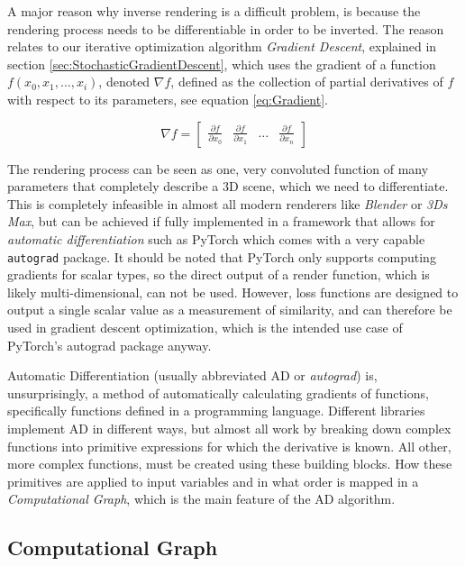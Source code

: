 A major reason why inverse rendering is a difficult problem, is because the rendering process needs to be differentiable in order to be inverted. The reason relates to our iterative optimization algorithm \textit{Gradient Descent}, explained in section \ref{sec:StochasticGradientDescent}, which uses the gradient of a function $f(x_0, x_1, ..., x_i)$, denoted $\nabla f$, defined as the collection of partial derivatives of $f$ with respect to its parameters, see equation \ref{eq:Gradient}. 

\begin{equation}\label{eq:Gradient}
    \nabla f = \begin{bmatrix} \frac{\partial f}{\partial x_0} & \frac{\partial f}{\partial x_1} & \dots & \frac{\partial f}{\partial x_n}\end{bmatrix}
\end{equation}

The rendering process can be seen as one, very convoluted function of many parameters that completely describe a 3D scene, which we need to differentiate. This is completely infeasible in almost all modern renderers like \textit{Blender} or \textit{3Ds Max}, but can be achieved if fully implemented in a framework that allows for \textit{automatic differentiation} such as PyTorch which comes with a very capable \texttt{autograd} package. It should be noted that PyTorch only supports computing gradients for scalar types, so the direct output of a render function, which is likely multi-dimensional, can not be used. However, loss functions are designed to output a single scalar value as a measurement of similarity, and can therefore be used in gradient descent optimization, which is the intended use case of PyTorch's autograd package anyway.

Automatic Differentiation (usually abbreviated AD or \textit{autograd}) is, unsurprisingly, a method of automatically calculating gradients of functions, specifically functions defined in a programming language. Different libraries implement AD in different ways, but almost all work by breaking down complex functions into primitive expressions for which the derivative is known. All other, more complex functions, must be created using these building blocks. How these primitives are applied to input variables and in what order is mapped in a \textit{Computational Graph}, which is the main feature of the AD algorithm.

\subsection{Computational Graph}\label{sec:ComputationalGraph}

